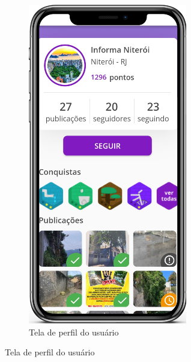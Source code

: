 \begin{figure}[ht]
\begin{subfigure}{0.33\textwidth}
	\end{subfigure}%
	\begin{subfigure}{0.33\textwidth}
		\centering
		\includegraphics[width=\textwidth]{images/colab_app_perfil.png}
		\caption{Tela de perfil do usuário}

\end{subfigure}
\end{figure}
